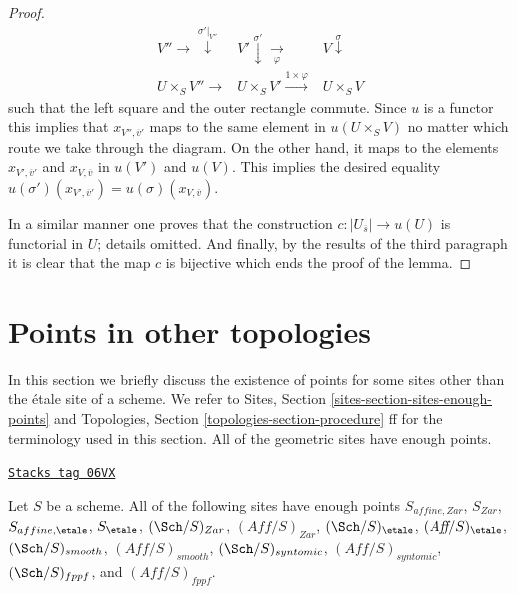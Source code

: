 \begin{proof}
$$
\begin{array}{ccc}V'' \longrightarrow\overset{\sigma'|_{V''}}{\downarrow} & V' \overset{\sigma'}{\downarrow}\underset{\varphi}{\longrightarrow} & V \overset{\sigma}{\downarrow} \\ U \times_S V'' \longrightarrow & U \times_S V' \overset{1 \times \varphi}{\longrightarrow} & U \times_S V\end{array}
$$
such that the left square and the outer rectangle commute.
Since $u$ is a functor this implies that
$x_{V'', \overline{v}'}$ maps to the same element in
$u(U \times_S V)$ no matter which route we take through the
diagram. On the other hand, it maps to the elements
$x_{V', \overline{v}'}$ and $x_{V, \overline{v}}$ in
$u(V')$ and $u(V)$. This implies the desired equality
$u(\sigma')(x_{V', \overline{v}'}) = u(\sigma)(x_{V, \overline{v}})$.

\medskip\noindent
In a similar manner one proves that the construction
$c : |U_{\overline{s}}| \to u(U)$ is functorial in $U$;
details omitted. And finally, by the results of the
third paragraph it is clear that the map $c$ is bijective
which ends the proof of the lemma.
\end{proof}

\section{Points in other topologies}
\label{etale-cohomology-section-points-topologies}
In this section we briefly discuss the existence of points for some
sites other than the \'etale site of a scheme. We refer to
Sites, Section \ref{sites-section-sites-enough-points}
and
Topologies, Section \ref{topologies-section-procedure} ff
for the terminology used in this section.
All of the geometric sites have enough points.

\begin{lemma}
\label{etale-cohomology-lemma-points-fppf}
\href{https://stacks.math.columbia.edu/tag/06VX}{\texttt{Stacks tag 06VX}}

Let $S$ be a scheme. All of the following sites have enough points
$S_{affine, Zar}$, $S_{Zar}$, $S_{affine, \etale}$, $S_\etale$,
$(\Sch/S)_{Zar}$, $(\textit{Aff}/S)_{Zar}$,
$(\Sch/S)_\etale$, $(\textit{Aff}/S)_\etale$,
$(\Sch/S)_{smooth}$, $(\textit{Aff}/S)_{smooth}$,
$(\Sch/S)_{syntomic}$, $(\textit{Aff}/S)_{syntomic}$,
$(\Sch/S)_{fppf}$, and $(\textit{Aff}/S)_{fppf}$.
\end{lemma}

